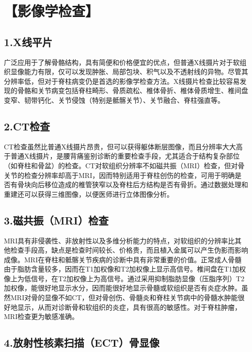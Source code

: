 \section{【影像学检查】}

\subsection{1.X线平片}

广泛应用于了解骨骼结构，具有简便和价格便宜的优点，但普通X线摄片对于软组织显像能力有限，仅可以发现肿胀、局部包块、积气以及不透射线的异物。尽管其分辨率低，但对于脊柱病变仍是首选的影像学检查方法。X线摄片检查比较容易发现的骨骼和关节病变包括脊柱畸形、骨质疏松、椎体骨折、椎体骨质增生、椎间盘变窄、韧带钙化、关节侵蚀（特别是骶髂关节）、关节融合、脊柱强直等。

\subsection{2.CT检查}

CT检查虽然比普通X线摄片昂贵，但可以获得躯体断层图像，而且分辨率大大高于普通X线摄片，是腰背痛鉴别诊断的重要检查手段，尤其适合于结构复杂部位（如脊柱和骨盆）的检查。CT对软组织分辨率不如磁共振（MRI）检查，但对骨关节的检查分辨率却高于MRI，因而特别适用于脊柱创伤的检查，可用于明确是否有骨块向后移位造成的椎管狭窄以及脊柱后方结构是否有骨折。通过数据处理和重建还可以获得三维图像，以便医师进行立体图像分析。

\subsection{3.磁共振（MRI）检查}

MRI具有非侵袭性、非放射性以及多维分析能力的特点，对软组织的分辨率比其他检查手段高，缺点是检查时间较长、价格贵，而且植入金属可以产生伪影而影响成像。MRI在脊柱和骶髂关节疾病的诊断中具有非常重要的价值。正常成人骨髓由于脂肪含量较多，因而在T1加权像和T2加权像上显示高信号。椎间盘在T1加权像上为低信号，在T2加权像上为高信号。通过采用抑制脂肪显像（压脂序列）T2加权像，能很好地显示水分，因而能很好地显示骨髓或软组织是否有炎症水肿。虽然MRI对骨的显像不如CT，但对骨创伤、骨髓炎和脊柱关节病中的骨髓水肿能很好地显示，从而对诊断骨和软组织的炎症，具有很高的敏感性。对于脊柱肿瘤，MRI检查更为敏感准确。

\subsection{4.放射性核素扫描（ECT）骨显像}

